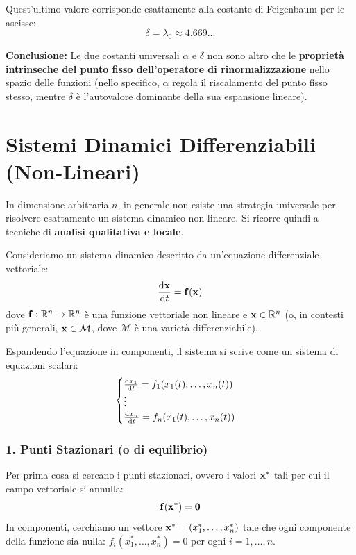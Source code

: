 \documentclass[openany]{book}
\theoremstyle{definition}
\theoremstyle{remark}
\newcommand{\R}{\mathbb{R}}
\begin{document}
Quest'ultimo valore corrisponde esattamente alla costante di Feigenbaum per le ascisse:
\begin{equation}
    \delta = \lambda_0 \approx 4.669...
\end{equation}

\vspace{0.5em}
\textbf{Conclusione:} Le due costanti universali $\alpha$ e $\delta$ non sono altro che le \textbf{proprietà intrinseche del punto fisso dell'operatore di rinormalizzazione} nello spazio delle funzioni (nello specifico, $\alpha$ regola il riscalamento del punto fisso stesso, mentre $\delta$ è l'autovalore dominante della sua espansione lineare).

\section{Sistemi Dinamici Differenziabili (Non-Lineari)}

In dimensione arbitraria $n$, in generale non esiste una strategia universale per risolvere esattamente un sistema dinamico non-lineare. Si ricorre quindi a tecniche di \textbf{analisi qualitativa e locale}.

Consideriamo un sistema dinamico descritto da un'equazione differenziale vettoriale:
\begin{equation}
    \dv{\vb{x}}{t} = \vb{f}(\vb{x})
\end{equation}
dove $\vb{f}: \R^n \to \R^n$ è una funzione vettoriale non lineare e $\vb{x} \in \R^n$ (o, in contesti più generali, $\vb{x} \in \mathcal{M}$, dove $\mathcal{M}$ è una varietà differenziabile).

Espandendo l'equazione in componenti, il sistema si scrive come un sistema di equazioni scalari:
\begin{equation}
    \begin{cases}
        \dv{x_1}{t} = f_1(x_1(t), \dots, x_n(t)) \\
        \vdots \\
        \dv{x_n}{t} = f_n(x_1(t), \dots, x_n(t))
    \end{cases}
\end{equation}

\subsubsection*{1. Punti Stazionari (o di equilibrio)}
Per prima cosa si cercano i punti stazionari, ovvero i valori $\vb{x}^*$ tali per cui il campo vettoriale si annulla:
\begin{equation}
    \vb{f}(\vb{x}^*) = \vb{0}
\end{equation}
In componenti, cerchiamo un vettore $\vb{x}^* = (x_1^*, \dots, x_n^*)$ tale che ogni componente della funzione sia nulla: $f_i(x_1^*, \dots, x_n^*) = 0$ per ogni $i=1,\dots,n$.
\end{document}
